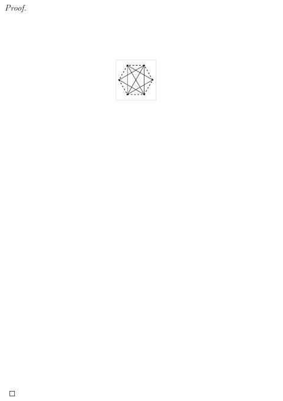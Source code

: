 \begin{proof}
\begin{figure}[t!]
\begin{minipage}[b]{.19\textwidth}
        \includegraphics[width=\textwidth,page=6]{images/polygon_conf}
        \subcaption{~}\label{fig:7_stick}
    \end{minipage}
    \begin{minipage}[b]{.19\textwidth}
        \centering

\end{minipage}
\end{figure}
\end{proof}
